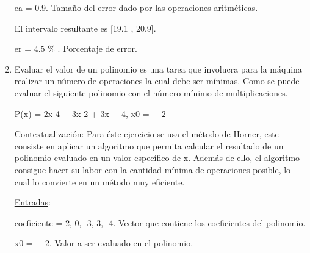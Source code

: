 \documentclass[12pt]{article}
\renewcommand{\_}{\kern-1.5pt\textunderscore\kern-1.5pt}
\begin{document}
\begin{enumerate}
\begin{justify}
ea = 0.9. Tamaño del error dado por las operaciones aritméticas. 
\end{justify}\par

\begin{justify}
El intervalo resultante es [19.1 , 20.9]. 
\end{justify}\par

\begin{justify}
er = 4.5 $\%$ . Porcentaje de error.
\end{justify}\par


\vspace{\baselineskip}
	\item Evaluar el valor de un polinomio es una tarea que involucra para la máquina realizar un número de operaciones la cual debe ser mínimas. Como se puede evaluar el siguiente polinomio con el número mínimo de multiplicaciones. \par

\begin{justify}
P(x) = 2x 4 $-$  3x 2 + 3x $-$  4, x0 = $-$ 2
\end{justify}\par


\vspace{\baselineskip}
\begin{justify}
Contextualización: Para éste ejercicio se usa el método de Horner, este consiste en aplicar un algoritmo que permita calcular el resultado de un polinomio evaluado en un valor específico de x. Además de ello, el algoritmo consigue hacer su labor con la cantidad mínima de operaciones posible, lo cual lo convierte en un método muy eficiente.
\end{justify}\par

\begin{justify}
\uline{Entradas}:
\end{justify}\par

\begin{justify}
coeficiente = 2, 0, -3, 3, -4. Vector que contiene los coeficientes del polinomio. 
\end{justify}\par

\begin{justify}
x0 = $-$ 2. Valor a ser evaluado en el polinomio. 
\end{justify}\par


\end{enumerate}
\end{document}
